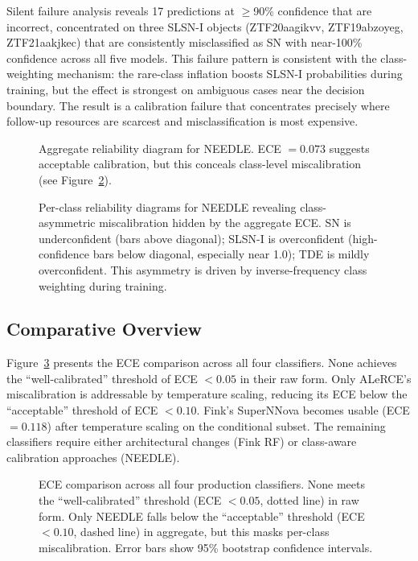 \documentclass[twocolumn]{aastex631}
\begin{document}
Silent failure analysis reveals 17 predictions at $\geq$90\% confidence that are incorrect, concentrated on three SLSN-I objects (ZTF20aagikvv, ZTF19abzoyeg, ZTF21aakjkec) that are consistently misclassified as SN with near-100\% confidence across all five models. This failure pattern is consistent with the class-weighting mechanism: the rare-class inflation boosts SLSN-I probabilities during training, but the effect is strongest on ambiguous cases near the decision boundary. The result is a calibration failure that concentrates precisely where follow-up resources are scarcest and misclassification is most expensive.

\begin{figure}
\caption{Aggregate reliability diagram for NEEDLE. ECE $= 0.073$ suggests acceptable calibration, but this conceals class-level miscalibration (see Figure~\ref{fig:needle_perclass}). \label{fig:needle_aggregate}}
\end{figure}

\begin{figure}
\caption{Per-class reliability diagrams for NEEDLE revealing class-asymmetric miscalibration hidden by the aggregate ECE. SN is underconfident (bars above diagonal); SLSN-I is overconfident (high-confidence bars below diagonal, especially near 1.0); TDE is mildly overconfident. This asymmetry is driven by inverse-frequency class weighting during training. \label{fig:needle_perclass}}
\end{figure}

\subsection{Comparative Overview}

Figure~\ref{fig:summary} presents the ECE comparison across all four classifiers. None achieves the ``well-calibrated'' threshold of ECE $< 0.05$ in their raw form. Only ALeRCE's miscalibration is addressable by temperature scaling, reducing its ECE below the ``acceptable'' threshold of ECE $< 0.10$. Fink's SuperNNova becomes usable (ECE $= 0.118$) after temperature scaling on the conditional subset. The remaining classifiers require either architectural changes (Fink RF) or class-aware calibration approaches (NEEDLE).

\begin{figure}
\caption{ECE comparison across all four production classifiers. None meets the ``well-calibrated'' threshold (ECE $< 0.05$, dotted line) in raw form. Only NEEDLE falls below the ``acceptable'' threshold (ECE $< 0.10$, dashed line) in aggregate, but this masks per-class miscalibration. Error bars show 95\% bootstrap confidence intervals. \label{fig:summary}}
\end{figure}
\end{document}
